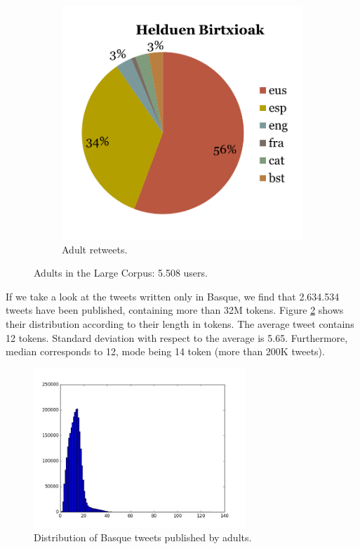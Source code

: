 \documentclass[information,article,submit,moreauthors,pdftex,10pt,a4paper]{Definitions/mdpi}
\begin{document}
\begin{figure}[H]
\begin{subfigure}[b]{0.48\linewidth}
    \includegraphics[width=\linewidth]{birtxio_heldu}
    \caption{Adult retweets.}
  \end{subfigure}
  \caption{Adults in the Large Corpus: 5.508 users.}
  \label{fig:adults}
\end{figure}

If we take a look at the tweets written only in Basque, we find that 2.634.534 tweets have been published, containing more than 32M tokens. Figure  \ref{fig:txio luze held} shows their distribution according to their length in tokens. The average tweet contains 12 tokens. Standard deviation with respect to the average is 5.65. Furthermore, median corresponds to 12, mode being 14 token (more than 200K tweets).

\begin{figure}[H]
  \centering
  \includegraphics[height=6cm]{graf_for}
  \caption{Distribution of Basque tweets published by adults.}
  \label{fig:txio luze held}
\end{figure}
\end{document}

